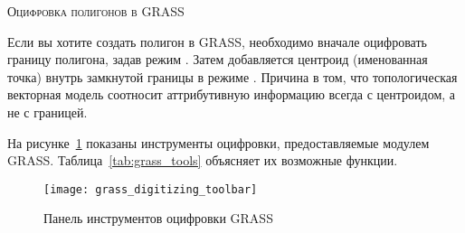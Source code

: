 \begin{Tip}\caption{\textsc{Оцифровка полигонов в GRASS}}
Если вы хотите создать полигон в GRASS, необходимо вначале оцифровать
границу полигона, задав режим . Затем
добавляется центроид (именованная точка) внутрь замкнутой границы в
режиме . Причина в том, что
топологическая векторная модель соотносит аттрибутивную информацию
всегда с центроидом, а не с границей.
\end{Tip}

\label{label_grasstoolbar}

На рисунке~\ref{fig:grass_digitizing_toolbar} показаны инструменты
оцифровки, предоставляемые модулем GRASS. Таблица~\ref{tab:grass_tools}
объясняет их возможные функции.

\begin{figure}[h]
   \centering
   \texttt{[image: grass\_digitizing\_toolbar]}
   \caption{Панель инструментов оцифровки GRASS \nixcaption}\label{fig:grass_digitizing_toolbar}
\end{figure}

